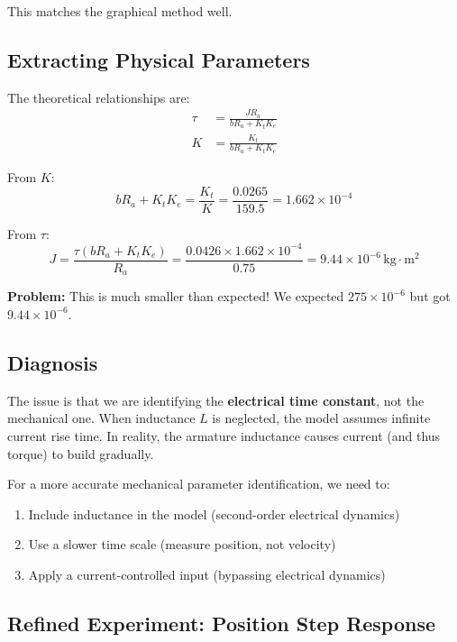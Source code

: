 This matches the graphical method well.

\subsection{Extracting Physical Parameters}

The theoretical relationships are:
\begin{align}
\tau &= \frac{JR_a}{bR_a + K_tK_e} \\
K &= \frac{K_t}{bR_a + K_tK_e}
\end{align}

From $K$:
\begin{equation}
bR_a + K_tK_e = \frac{K_t}{K} = \frac{0.0265}{159.5} = 1.662 \times 10^{-4}
\end{equation}

From $\tau$:
\begin{equation}
J = \frac{\tau(bR_a + K_tK_e)}{R_a} = \frac{0.0426 \times 1.662 \times 10^{-4}}{0.75} = 9.44 \times 10^{-6} \, \text{kg}\cdot\text{m}^2
\end{equation}

\textbf{Problem:} This is much smaller than expected! We expected $275 \times 10^{-6}$ but got $9.44 \times 10^{-6}$.

\subsection{Diagnosis}

The issue is that we are identifying the \textbf{electrical time constant}, not the mechanical one. When inductance $L$ is neglected, the model assumes infinite current rise time. In reality, the armature inductance causes current (and thus torque) to build gradually.

For a more accurate mechanical parameter identification, we need to:
\begin{enumerate}
    \item Include inductance in the model (second-order electrical dynamics)
    \item Use a slower time scale (measure position, not velocity)
    \item Apply a current-controlled input (bypassing electrical dynamics)
\end{enumerate}

\subsection{Refined Experiment: Position Step Response}

